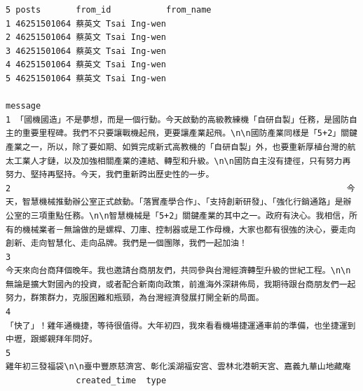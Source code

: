 \documentclass[]{book}
\theoremstyle{definition}
\theoremstyle{definition}
\theoremstyle{remark}
\begin{document}
\begin{verbatim}
5 posts       from_id           from_name
1 46251501064 蔡英文 Tsai Ing-wen
2 46251501064 蔡英文 Tsai Ing-wen
3 46251501064 蔡英文 Tsai Ing-wen
4 46251501064 蔡英文 Tsai Ing-wen
5 46251501064 蔡英文 Tsai Ing-wen
                                                                                                                                                                                                                                                                                                                                                                                        message
1 「國機國造」不是夢想，而是一個行動。今天啟動的高級教練機「自研自製」任務，是國防自主的重要里程碑。我們不只要讓戰機起飛，更要讓產業起飛。\n\n國防產業同樣是「5+2」關鍵產業之一，所以，除了要如期、如質完成新式高教機的「自研自製」外，也要重新厚植台灣的航太工業人才鏈，以及加強相關產業的連結、轉型和升級。\n\n國防自主沒有捷徑，只有努力再努力、堅持再堅持。今天，我們重新跨出歷史性的一步。
2                                                                   今天，智慧機械推動辦公室正式啟動。「落實產學合作」、「支持創新研發」、「強化行銷通路」是辦公室的三項重點任務。\n\n智慧機械是「5+2」關鍵產業的其中之一。政府有決心。我相信，所有的機械業者－無論做的是螺桿、刀庫、控制器或是工作母機，大家也都有很強的決心，要走向創新、走向智慧化、走向品牌。我們是一個團隊，我們一起加油！
3                                                                                                                                                          今天來向台商拜個晚年。我也邀請台商朋友們，共同參與台灣經濟轉型升級的世紀工程。\n\n無論是擴大對國內的投資，或者配合新南向政策，前進海外深耕佈局，我期待跟台商朋友們一起努力，群策群力，克服困難和瓶頸，為台灣經濟發展打開全新的局面。
4                                                                                                                                                                                                                                                                                    「快了」！雞年通機捷，等待很值得。大年初四，我來看看機場捷運通車前的準備，也坐捷運到中壢，跟鄉親拜年問好。
5                                                                                                                                                                                                                                                                                                            雞年初三發福袋\n\n臺中豐原慈濟宮、彰化溪湖福安宮、雲林北港朝天宮、嘉義九華山地藏庵
              created_time  type

\end{verbatim}
\end{document}
